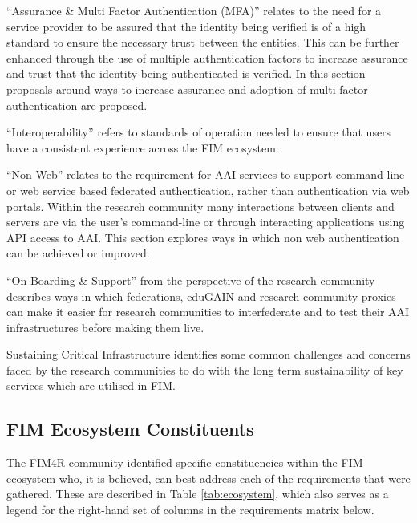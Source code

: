 \documentclass[fleqn,10pt]{wlscirep}
\begin{document}
{“Assurance \& Multi Factor Authentication (MFA)” relates to the need for a service provider to be assured that the identity being verified is of a high standard to ensure the necessary trust between the entities.  This can be further enhanced through the use of multiple authentication factors to increase assurance and trust that the identity being authenticated is verified.  In this section proposals around ways to increase assurance and adoption of multi factor authentication are proposed. 

“Interoperability” refers to standards of operation needed to ensure that users have a consistent experience across the FIM ecosystem. 

“Non Web” relates to the requirement for AAI services to support command line or web service based federated authentication, rather than authentication via web portals.  Within the research community many interactions between clients and servers are via the user's command-line or through interacting applications using API access to AAI.  This section explores ways in which non web authentication can be achieved or improved.  

“On-Boarding \& Support” from the perspective of the research community describes ways in which federations, eduGAIN and research community proxies can make it easier for research communities to interfederate and to test their AAI infrastructures before making them live.

Sustaining Critical Infrastructure identifies some common challenges and concerns faced by the research communities to do with the long term sustainability of key services which are utilised in FIM. 

\subsection{FIM Ecosystem Constituents}
The FIM4R community identified specific constituencies within the FIM ecosystem who, it is believed, can best address each of the requirements that were gathered. These are described in Table \ref{tab:ecosystem}, which also serves as a legend for the right-hand set of columns in the requirements matrix below.

}
\end{document}
